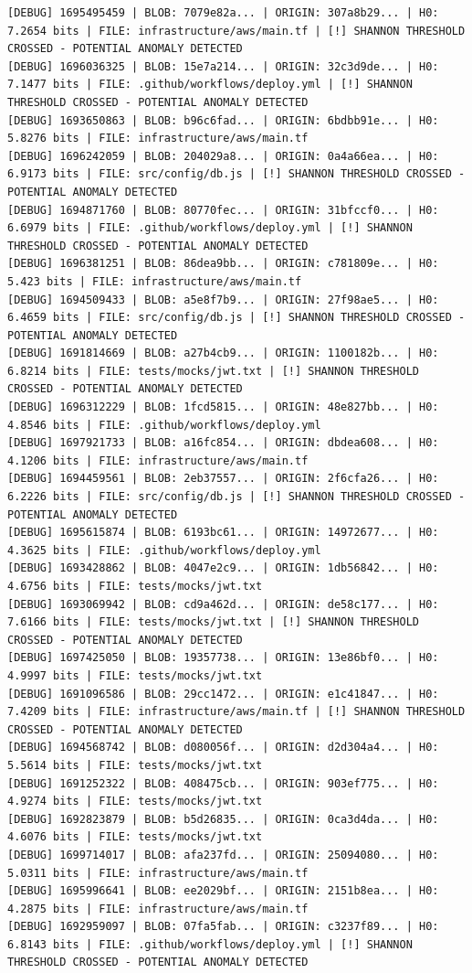 \documentclass[12pt, a4paper, oneside]{report}
\begin{document}
\begin{lstlisting}[basicstyle=\tiny\ttfamily]
[DEBUG] 1695495459 | BLOB: 7079e82a... | ORIGIN: 307a8b29... | H0: 7.2654 bits | FILE: infrastructure/aws/main.tf | [!] SHANNON THRESHOLD CROSSED - POTENTIAL ANOMALY DETECTED
[DEBUG] 1696036325 | BLOB: 15e7a214... | ORIGIN: 32c3d9de... | H0: 7.1477 bits | FILE: .github/workflows/deploy.yml | [!] SHANNON THRESHOLD CROSSED - POTENTIAL ANOMALY DETECTED
[DEBUG] 1693650863 | BLOB: b96c6fad... | ORIGIN: 6bdbb91e... | H0: 5.8276 bits | FILE: infrastructure/aws/main.tf
[DEBUG] 1696242059 | BLOB: 204029a8... | ORIGIN: 0a4a66ea... | H0: 6.9173 bits | FILE: src/config/db.js | [!] SHANNON THRESHOLD CROSSED - POTENTIAL ANOMALY DETECTED
[DEBUG] 1694871760 | BLOB: 80770fec... | ORIGIN: 31bfccf0... | H0: 6.6979 bits | FILE: .github/workflows/deploy.yml | [!] SHANNON THRESHOLD CROSSED - POTENTIAL ANOMALY DETECTED
[DEBUG] 1696381251 | BLOB: 86dea9bb... | ORIGIN: c781809e... | H0: 5.423 bits | FILE: infrastructure/aws/main.tf
[DEBUG] 1694509433 | BLOB: a5e8f7b9... | ORIGIN: 27f98ae5... | H0: 6.4659 bits | FILE: src/config/db.js | [!] SHANNON THRESHOLD CROSSED - POTENTIAL ANOMALY DETECTED
[DEBUG] 1691814669 | BLOB: a27b4cb9... | ORIGIN: 1100182b... | H0: 6.8214 bits | FILE: tests/mocks/jwt.txt | [!] SHANNON THRESHOLD CROSSED - POTENTIAL ANOMALY DETECTED
[DEBUG] 1696312229 | BLOB: 1fcd5815... | ORIGIN: 48e827bb... | H0: 4.8546 bits | FILE: .github/workflows/deploy.yml
[DEBUG] 1697921733 | BLOB: a16fc854... | ORIGIN: dbdea608... | H0: 4.1206 bits | FILE: infrastructure/aws/main.tf
[DEBUG] 1694459561 | BLOB: 2eb37557... | ORIGIN: 2f6cfa26... | H0: 6.2226 bits | FILE: src/config/db.js | [!] SHANNON THRESHOLD CROSSED - POTENTIAL ANOMALY DETECTED
[DEBUG] 1695615874 | BLOB: 6193bc61... | ORIGIN: 14972677... | H0: 4.3625 bits | FILE: .github/workflows/deploy.yml
[DEBUG] 1693428862 | BLOB: 4047e2c9... | ORIGIN: 1db56842... | H0: 4.6756 bits | FILE: tests/mocks/jwt.txt
[DEBUG] 1693069942 | BLOB: cd9a462d... | ORIGIN: de58c177... | H0: 7.6166 bits | FILE: tests/mocks/jwt.txt | [!] SHANNON THRESHOLD CROSSED - POTENTIAL ANOMALY DETECTED
[DEBUG] 1697425050 | BLOB: 19357738... | ORIGIN: 13e86bf0... | H0: 4.9997 bits | FILE: tests/mocks/jwt.txt
[DEBUG] 1691096586 | BLOB: 29cc1472... | ORIGIN: e1c41847... | H0: 7.4209 bits | FILE: infrastructure/aws/main.tf | [!] SHANNON THRESHOLD CROSSED - POTENTIAL ANOMALY DETECTED
[DEBUG] 1694568742 | BLOB: d080056f... | ORIGIN: d2d304a4... | H0: 5.5614 bits | FILE: tests/mocks/jwt.txt
[DEBUG] 1691252322 | BLOB: 408475cb... | ORIGIN: 903ef775... | H0: 4.9274 bits | FILE: tests/mocks/jwt.txt
[DEBUG] 1692823879 | BLOB: b5d26835... | ORIGIN: 0ca3d4da... | H0: 4.6076 bits | FILE: tests/mocks/jwt.txt
[DEBUG] 1699714017 | BLOB: afa237fd... | ORIGIN: 25094080... | H0: 5.0311 bits | FILE: infrastructure/aws/main.tf
[DEBUG] 1695996641 | BLOB: ee2029bf... | ORIGIN: 2151b8ea... | H0: 4.2875 bits | FILE: infrastructure/aws/main.tf
[DEBUG] 1692959097 | BLOB: 07fa5fab... | ORIGIN: c3237f89... | H0: 6.8143 bits | FILE: .github/workflows/deploy.yml | [!] SHANNON THRESHOLD CROSSED - POTENTIAL ANOMALY DETECTED
\end{lstlisting}
\end{document}
